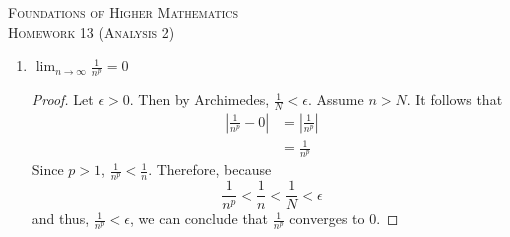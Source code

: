 \documentclass{article}
\theoremstyle{problem}
\theoremstyle{plain}
\theoremstyle{remark}
\newcommand{\abs}[1] {
  \left| #1 \right|
}
\newcommand{\myln}[1] {
  \ln{\left( #1 \right)}
}
\begin{document}
\begin{center}
  \textsc{\Large Foundations of Higher Mathematics}\\[.3cm]
  \textsc{\Large Homework 13 (Analysis 2)}
\end{center}

\begin{enumerate}
\item %
  $\displaystyle \lim_{n \to \infty} \frac{1}{n^p} = 0$
  \begin{proof}
    Let $\epsilon > 0$. Then by Archimedes, $\frac{1}{N} < \epsilon$. Assume $n > N$. It follows that
\begin{align*}
  \abs{\frac{1}{n^p} - 0} &= \abs{\frac{1}{n^p}}\\
  &= \frac{1}{n^p}
\end{align*}
Since $p > 1$, $\frac{1}{n^p} < \frac{1}{n}$. Therefore, because
$$
\frac{1}{n^p} < \frac{1}{n} < \frac{1}{N} < \epsilon
$$
and thus, $\frac{1}{n^p} < \epsilon$, we can conclude that $\frac{1}{n^p}$ converges to $0$.

  \end{proof}


\end{enumerate}
\end{document}
